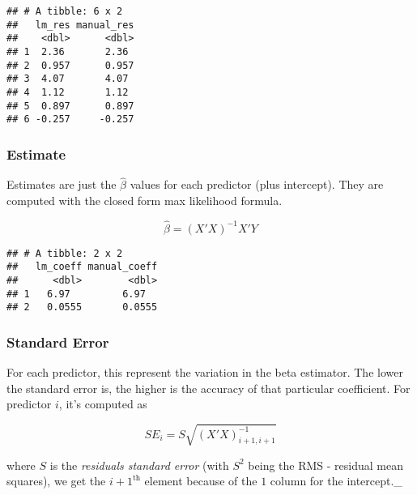 \documentclass[
  oneside]{book}
\newenvironment{Shaded}{\begin{snugshade}}{\end{snugshade}}
\newcommand{\AttributeTok}[1]{\textcolor[rgb]{0.77,0.63,0.00}{#1}}
\newcommand{\FunctionTok}[1]{\textcolor[rgb]{0.00,0.00,0.00}{#1}}
\newcommand{\NormalTok}[1]{#1}
\newcommand{\OtherTok}[1]{\textcolor[rgb]{0.56,0.35,0.01}{#1}}
\newcommand{\SpecialCharTok}[1]{\textcolor[rgb]{0.00,0.00,0.00}{#1}}
\begin{document}
\begin{verbatim}
## # A tibble: 6 x 2
##   lm_res manual_res
##    <dbl>      <dbl>
## 1  2.36       2.36 
## 2  0.957      0.957
## 3  4.07       4.07 
## 4  1.12       1.12 
## 5  0.897      0.897
## 6 -0.257     -0.257
\end{verbatim}

\hypertarget{estimate}{%
\subsubsection{Estimate}\label{estimate}}

Estimates are just the \(\hat\beta\) values for each predictor (plus intercept).
They are computed with the closed form max likelihood formula.

\[
\hat\beta = (X'X)^{-1}X'Y
\]

\begin{Shaded}
\end{Shaded}

\begin{verbatim}
## # A tibble: 2 x 2
##   lm_coeff manual_coeff
##      <dbl>        <dbl>
## 1   6.97         6.97  
## 2   0.0555       0.0555
\end{verbatim}

\hypertarget{standard-error}{%
\subsubsection{Standard Error}\label{standard-error}}

For each predictor, this represent the variation in the beta estimator. The lower
the standard error is, the higher is the accuracy of that particular coefficient.
For predictor \(i\), it's computed as

\[
SE_i = S \sqrt{(X'X)^{-1}_{i+1,i+1}}
\]

where \(S\) is the \emph{residuals standard error} (with \(S^2\) being the RMS - residual
mean squares), we get the \(i+1^{\text{th}}\) element because of the \(1\) column for the intercept.\_
\end{document}
